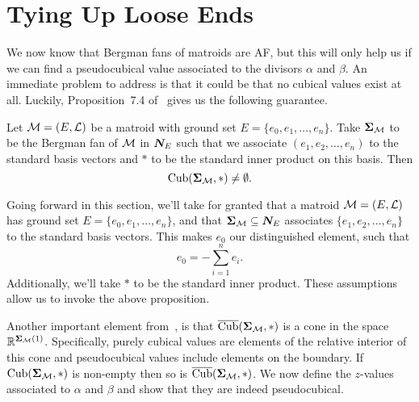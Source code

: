 \documentclass[12pt,oneside]{../../sfsuthesis}
\begin{document}
\section{Tying Up Loose Ends}

We now know that Bergman fans of matroids are AF, but this will only help us if we can find a pseudocubical value associated to the divisors \( \alpha \) and \( \beta \).
An immediate problem to address is that it could be that no cubical values exist at all.
Luckily, Proposition~7.4 of~\cite{nathansonTropicalFansNormal2023} gives us the following guarantee.
\begin{proposition}\th\label{thm:existCubical}
    Let \( \mathcal{M} = (E, \mathcal{L}) \) be a matroid with ground set \( E = \{ e_0, e_1, \dots, e_n \} \).
    Take \( {\bm{\Sigma}}_{\mathcal{M}} \) to be the Bergman fan of \( \mathcal{M} \) in \( \bm{N}_E \) such that we associate \( (e_1, e_2, \dots, e_n) \) to the standard basis vectors and \( \ast \) to be the standard inner product on this basis.
    Then
    \[
        \operatorname{Cub}({\bm{\Sigma}}_{\mathcal{M}}, \ast) \neq \emptyset.
    \]
\end{proposition}

Going forward in this section, we'll take for granted that a matroid \( \mathcal{M} = (E, \mathcal{L}) \) has ground set \( E = \{ e_0, e_1, \dots, e_n \} \), and that \( {\bm{\Sigma}}_{\mathcal{M}} \subseteq \bm{N}_E \) associates \( \{e_1, e_2, \dots, e_n\} \) to the standard basis vectors.
This makes \( e_0 \) our distinguished element, such that
\[
    e_0 = -\sum_{i=1}^n e_i.
\]
Additionally, we'll take \( \ast \) to be the standard inner product.
These assumptions allow us to invoke the above proposition.

Another important element from~\cite{nathansonTropicalFansNormal2023}, is that \( \operatorname{\overline{Cub}}({\bm{\Sigma}}_{\mathcal{M}}, \ast) \) is a cone in the space \( \mathbb{R}^{{\bm{\Sigma}}_{\mathcal{M}}(1)} \).
Specifically, purely cubical values are elements of the relative interior of this cone and pseudocubical values include elements on the boundary.
If \( \operatorname{Cub}({\bm{\Sigma}}_{\mathcal{M}}, \ast) \) is non-empty then so is \( \operatorname{\overline{Cub}}({\bm{\Sigma}}_{\mathcal{M}}, \ast) \).
We now define the \( z \)-values associated to \( \alpha \) and \( \beta \) and show that they are indeed pseudocubical.
\end{document}
